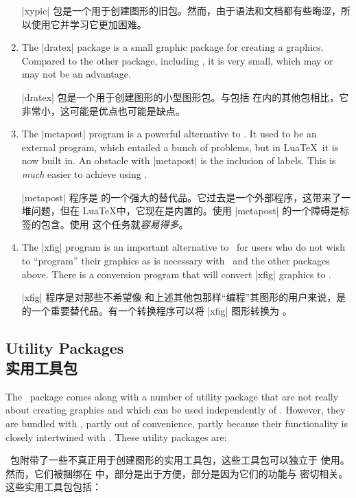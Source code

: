 \begin{enumerate}
        |xypic| 包是一个用于创建图形的旧包。然而，由于语法和文档都有些晦涩，所以使用它并学习它更加困难。
    \item The |dratex| package is a small graphic package for creating a
        graphics. Compared to the other package, including \tikzname, it is
        very small, which may or may not be an advantage.

        |dratex| 包是一个用于创建图形的小型图形包。与包括 \tikzname 在内的其他包相比，它非常小，这可能是优点也可能是缺点。
    \item The |metapost| program is a powerful alternative to \tikzname. It
        used to be an external program, which entailed a bunch of problems,
        but in Lua\TeX\ it is now built in. An obstacle with |metapost| is
        the inclusion of labels. This is \emph{much} easier to achieve using
        \pgfname.

        |metapost| 程序是 \tikzname 的一个强大的替代品。它过去是一个外部程序，这带来了一堆问题，但在 Lua\TeX 中，它现在是内置的。使用 |metapost| 的一个障碍是标签的包含。使用 \pgfname 这个任务就\emph{容易得多}。
    \item The |xfig| program is an important alternative to \tikzname\ for
        users who do not wish to ``program'' their graphics as is necessary
        with \tikzname\ and the other packages above. There is a conversion
        program that will convert |xfig| graphics to \tikzname.

        |xfig| 程序是对那些不希望像 \tikzname 和上述其他包那样“编程”其图形的用户来说，是 \tikzname 的一个重要替代品。有一个转换程序可以将 |xfig| 图形转换为 \tikzname。
\end{enumerate}





\subsection{Utility Packages\\实用工具包}

The \pgfname\ package comes along with a number of utility package that are not
really about creating graphics and which can be used independently of \pgfname.
However, they are bundled with \pgfname, partly out of convenience, partly
because their functionality is closely intertwined with \pgfname. These utility
packages are:

\pgfname\ 包附带了一些不真正用于创建图形的实用工具包，这些工具包可以独立于 \pgfname 使用。然而，它们被捆绑在 \pgfname 中，部分是出于方便，部分是因为它们的功能与 \pgfname 密切相关。这些实用工具包包括：

